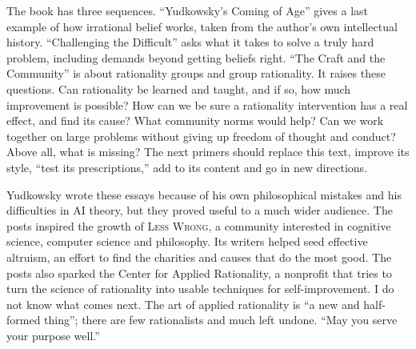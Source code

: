 The book has three sequences. ``Yudkowsky's Coming of Age'' gives a last example of how irrational belief works, taken from the author's own intellectual history. ``Challenging the Difficult'' asks what it takes to solve a truly hard problem, including demands beyond getting beliefs right. ``The Craft and the Community'' is about rationality groups and group rationality. It raises these questions. Can rationality be learned and taught, and if so, how much improvement is possible? How can we be sure a rationality intervention has a real effect, and find its cause? What community norms would help? Can we work together on large problems without giving up freedom of thought and conduct? Above all, what is missing? The next primers should replace this text, improve its style, ``test its prescriptions,'' add to its content and go in new directions.

Yudkowsky wrote these essays because of his own philosophical mistakes and his difficulties in AI theory, but they proved useful to a much wider audience. The posts inspired the growth of \textsc{Less Wrong}, a community interested in cognitive science, computer science and philosophy. Its writers helped seed effective altruism, an effort to find the charities and causes that do the most good. The posts also sparked the Center for Applied Rationality, a nonprofit that tries to turn the science of rationality into usable techniques for self-improvement. I do not know what comes next. The art of applied rationality is ``a new and half-formed thing''; there are few rationalists and much left undone. ``May you serve your purpose well.''
